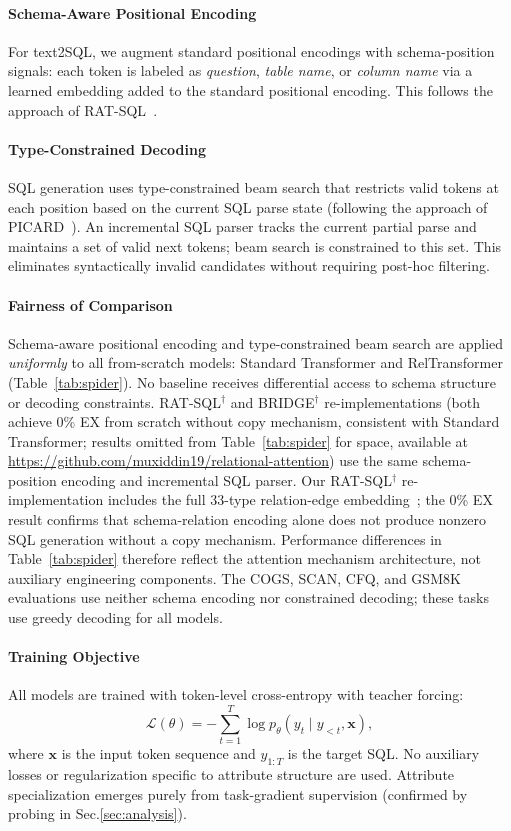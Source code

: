 \documentclass[conference]{IEEEtran}
\begin{document}
\paragraph{Schema-Aware Positional Encoding}
For text2SQL, we augment standard positional encodings with schema-position signals: each token is labeled as \textit{question}, \textit{table name}, or \textit{column name} via a learned embedding added to the standard positional encoding. This follows the approach of RAT-SQL~\cite{wang2020ratsql}.

\paragraph{Type-Constrained Decoding}
SQL generation uses type-constrained beam search that restricts valid tokens at each position based on the current SQL parse state (following the approach of PICARD~\cite{scholak2021picard}). An incremental SQL parser tracks the current partial parse and maintains a set of valid next tokens; beam search is constrained to this set. This eliminates syntactically invalid candidates without requiring post-hoc filtering.

\paragraph{Fairness of Comparison}
Schema-aware positional encoding and type-constrained beam search are applied \emph{uniformly} to all from-scratch models: Standard Transformer and RelTransformer (Table~\ref{tab:spider}). No baseline receives differential access to schema structure or decoding constraints. RAT-SQL$^\dagger$ and BRIDGE$^\dagger$ re-implementations (both achieve 0\% EX from scratch without copy mechanism, consistent with Standard Transformer; results omitted from Table~\ref{tab:spider} for space, available at \url{https://github.com/muxiddin19/relational-attention}) use the same schema-position encoding and incremental SQL parser. Our RAT-SQL$^\dagger$ re-implementation includes the full 33-type relation-edge embedding~\cite{wang2020ratsql}; the 0\% EX result confirms that schema-relation encoding alone does not produce nonzero SQL generation without a copy mechanism. Performance differences in Table~\ref{tab:spider} therefore reflect the attention mechanism architecture, not auxiliary engineering components. The COGS, SCAN, CFQ, and GSM8K evaluations use neither schema encoding nor constrained decoding; these tasks use greedy decoding for all models.

\paragraph{Training Objective}
All models are trained with token-level cross-entropy with teacher forcing:
\begin{equation}
\mathcal{L}(\theta) = -\sum_{t=1}^{T} \log p_\theta(y_t \mid y_{<t}, \mathbf{x}),
\end{equation}
where $\mathbf{x}$ is the input token sequence and $y_{1:T}$ is the target SQL. No auxiliary losses or regularization specific to attribute structure are used. Attribute specialization emerges purely from task-gradient supervision (confirmed by probing in Sec.\ref{sec:analysis}).
\end{document}
